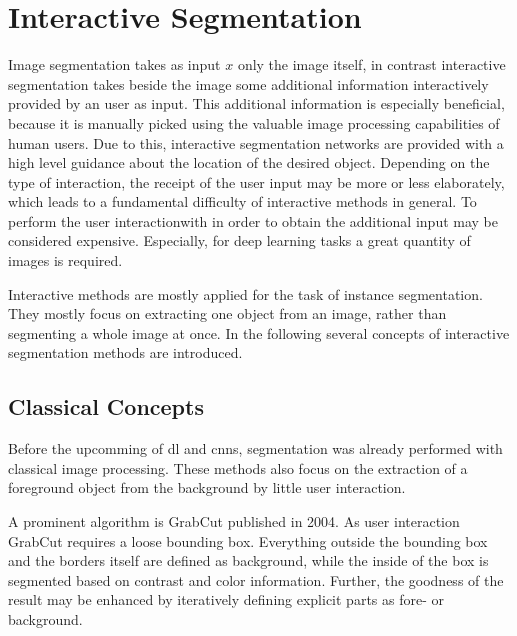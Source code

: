 
\section{Interactive Segmentation}\label{ord:ch2:sec3}

Image segmentation takes as input $x$ only the image itself, in contrast interactive segmentation takes beside the image some additional information interactively provided by an user as input.
This additional information is especially beneficial, because it is manually picked using the valuable image processing capabilities of human users.
Due to this, interactive segmentation networks are provided with a high level guidance about the location of the desired object.
Depending on the type of interaction, the receipt of the user input may be more or less elaborately, which leads to a fundamental difficulty of interactive methods in general.
To perform the user interactionwith in order to obtain the additional input may be considered expensive.
Especially, for deep learning tasks a great quantity of images is required.

Interactive methods are mostly applied for the task of instance segmentation.
They mostly focus on extracting one object from an image, rather than segmenting a whole image at once.
In the following several concepts of interactive segmentation methods are introduced.

\subsection{Classical Concepts}\label{ord:ch2:sec3:subsec1}
Before the upcomming of \gls{dl} and \glspl{cnn}, segmentation was already performed with classical image processing.
These methods also focus on the extraction of a foreground object from the background by little user interaction.

A prominent algorithm is GrabCut \cite{RKB04-GrabCut} published in 2004.
As user interaction GrabCut requires a loose bounding box.
Everything outside the bounding box and the borders itself are defined as background, while the inside of the box is segmented based on contrast and color information.
Further, the goodness of the result may be enhanced by iteratively defining explicit parts as fore- or background.

